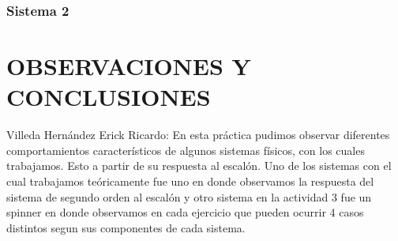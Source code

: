 \subsubsection{Sistema 2}

\section{OBSERVACIONES Y CONCLUSIONES}
Villeda Hernández Erick Ricardo: En esta práctica pudimos observar diferentes comportamientos característicos de algunos sistemas físicos, con los cuales trabajamos. Esto a partir de su respuesta al escalón. Uno de los sistemas con el cual trabajamos teóricamente fue uno en donde observamos la respuesta del sistema de segundo orden al escalón y otro sistema en la actividad 3 fue un spinner en donde observamos en cada ejercicio que pueden ocurrir 4 casos distintos segun sus componentes de cada sistema.